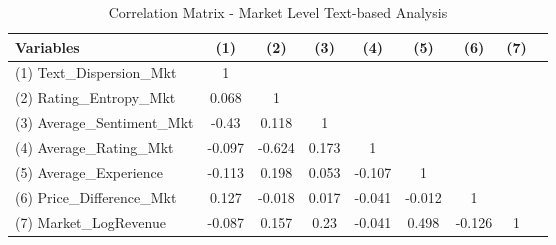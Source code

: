 \begin{table}[H]
\centering
\begin{tabular}{lcccccccc} \toprule
Variables                   & (1)    & (2)    & (3)   & (4)    & (5)    & (6)        & (7)     \\\midrule
(1) Text\_Dispersion\_Mkt   & 1      & \multicolumn{6}{l}{}                                    \\
(2) Rating\_Entropy\_Mkt    & 0.068  & 1      & \multicolumn{5}{l}{}                           \\
(3) Average\_Sentiment\_Mkt & -0.43  & 0.118  & 1     & \multicolumn{4}{l}{}                   \\
(4) Average\_Rating\_Mkt    & -0.097 & -0.624 & 0.173 & 1      & \multicolumn{3}{l}{}          \\
(5) Average\_Experience              & -0.113 & 0.198  & 0.053 & -0.107 & 1      & \multicolumn{2}{l}{} \\
(6) Price\_Difference\_Mkt        & 0.127  & -0.018 & 0.017 & -0.041 & -0.012 & 1          &         \\
(7) Market\_LogRevenue      & -0.087 & 0.157  & 0.23  & -0.041 & 0.498  & -0.126     & 1 \\\bottomrule
\end{tabular}%
\caption{Correlation Matrix -  Market Level Text-based Analysis}
\label{ corr_mkt_text}
\end{table} 